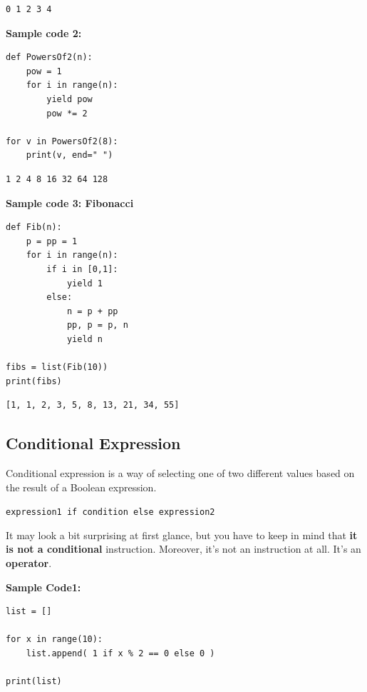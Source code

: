 \documentclass[11pt]{article}
\begin{document}
\begin{verbatim}
0 1 2 3 4 
\end{verbatim}


\vspace{10 mm}

\textbf{Sample code 2:} 
\begin{verbatim}
def PowersOf2(n):
	pow = 1
	for i in range(n):
		yield pow
		pow *= 2

for v in PowersOf2(8):
	print(v, end=" ")
\end{verbatim}

\begin{verbatim}
1 2 4 8 16 32 64 128 
\end{verbatim}

\vspace{12 mm}

\textbf{Sample code 3: Fibonacci} 
\begin{verbatim}
def Fib(n):
	p = pp = 1
	for i in range(n):
		if i in [0,1]:
			yield 1
		else:
			n = p + pp
			pp, p = p, n
			yield n

fibs = list(Fib(10))
print(fibs)
\end{verbatim}

\begin{verbatim}
[1, 1, 2, 3, 5, 8, 13, 21, 34, 55]
\end{verbatim}

\newpage

\subsection{Conditional Expression}
\label{sec:org990a30d}
Conditional expression is a way of selecting one of two different
values based on the result of a Boolean expression.

\texttt{expression1 if condition else expression2}

It may look a bit surprising at first glance, but you have to keep in
mind that \textbf{it is not a conditional} instruction. Moreover, it’s not an
instruction at all. It’s an \textbf{operator}.

\vspace{10 mm}

\textbf{Sample Code1:}
\begin{verbatim}
list = []

for x in range(10):
	list.append( 1 if x % 2 == 0 else 0 )

print(list)
\end{verbatim}
\end{document}

